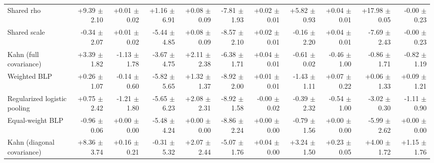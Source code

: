 \begin{tabular}{lrrrrrrrrrr}
Shared rho & +9.39 {\scriptsize $\pm$ 2.10} & +0.01 {\scriptsize $\pm$ 0.02} & +1.16 {\scriptsize $\pm$ 6.91} & +0.08 {\scriptsize $\pm$ 0.09} & -7.81 {\scriptsize $\pm$ 1.93} & +0.02 {\scriptsize $\pm$ 0.01} & +5.82 {\scriptsize $\pm$ 0.93} & +0.04 {\scriptsize $\pm$ 0.01} & +17.98 {\scriptsize $\pm$ 0.05} & -0.00 {\scriptsize $\pm$ 0.23} \\
Shared scale & -0.34 {\scriptsize $\pm$ 2.07} & +0.01 {\scriptsize $\pm$ 0.02} & -5.44 {\scriptsize $\pm$ 4.85} & +0.08 {\scriptsize $\pm$ 0.09} & -8.57 {\scriptsize $\pm$ 2.10} & +0.02 {\scriptsize $\pm$ 0.01} & -0.16 {\scriptsize $\pm$ 2.20} & +0.04 {\scriptsize $\pm$ 0.01} & -7.69 {\scriptsize $\pm$ 2.43} & -0.00 {\scriptsize $\pm$ 0.23} \\
Kahn (full covariance) & +3.39 {\scriptsize $\pm$ 1.82} & -1.13 {\scriptsize $\pm$ 1.78} & -3.67 {\scriptsize $\pm$ 4.75} & +2.11 {\scriptsize $\pm$ 2.38} & -6.38 {\scriptsize $\pm$ 1.71} & +0.04 {\scriptsize $\pm$ 0.01} & -0.61 {\scriptsize $\pm$ 0.02} & -0.46 {\scriptsize $\pm$ 1.00} & -0.86 {\scriptsize $\pm$ 1.71} & -0.82 {\scriptsize $\pm$ 1.19} \\
Weighted BLP & +0.26 {\scriptsize $\pm$ 1.07} & -0.14 {\scriptsize $\pm$ 0.60} & -5.82 {\scriptsize $\pm$ 5.65} & +1.32 {\scriptsize $\pm$ 1.37} & -8.92 {\scriptsize $\pm$ 2.00} & +0.01 {\scriptsize $\pm$ 0.01} & -1.43 {\scriptsize $\pm$ 1.11} & +0.07 {\scriptsize $\pm$ 0.22} & +0.06 {\scriptsize $\pm$ 1.33} & +0.09 {\scriptsize $\pm$ 1.21} \\
Regularized logistic pooling & +0.75 {\scriptsize $\pm$ 2.42} & -1.21 {\scriptsize $\pm$ 1.80} & -5.65 {\scriptsize $\pm$ 6.23} & +2.08 {\scriptsize $\pm$ 2.31} & -8.92 {\scriptsize $\pm$ 1.58} & -0.00 {\scriptsize $\pm$ 0.02} & -0.39 {\scriptsize $\pm$ 2.32} & -0.54 {\scriptsize $\pm$ 1.00} & -3.02 {\scriptsize $\pm$ 0.30} & -1.11 {\scriptsize $\pm$ 0.90} \\
Equal-weight BLP & -0.96 {\scriptsize $\pm$ 0.06} & +0.00 {\scriptsize $\pm$ 0.00} & -5.48 {\scriptsize $\pm$ 4.24} & +0.00 {\scriptsize $\pm$ 0.00} & -8.86 {\scriptsize $\pm$ 2.24} & +0.00 {\scriptsize $\pm$ 0.00} & -0.79 {\scriptsize $\pm$ 1.56} & +0.00 {\scriptsize $\pm$ 0.00} & -5.99 {\scriptsize $\pm$ 2.62} & +0.00 {\scriptsize $\pm$ 0.00} \\
Kahn (diagonal covariance) & +8.36 {\scriptsize $\pm$ 3.74} & +0.16 {\scriptsize $\pm$ 0.21} & -0.31 {\scriptsize $\pm$ 5.32} & +2.07 {\scriptsize $\pm$ 2.44} & -5.07 {\scriptsize $\pm$ 1.76} & +0.04 {\scriptsize $\pm$ 0.00} & +3.24 {\scriptsize $\pm$ 1.50} & +0.23 {\scriptsize $\pm$ 0.05} & +4.00 {\scriptsize $\pm$ 1.72} & +1.15 {\scriptsize $\pm$ 1.76} \\

\end{tabular}
